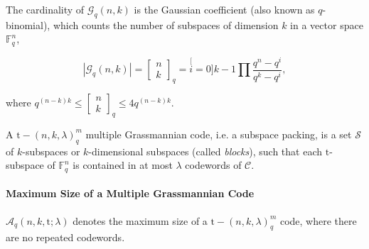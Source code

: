 The cardinality of $\mathcal{G}_{q}\left(n,k\right)$ is the Gaussian
coefficient (also known as $q$-binomial), which counts the number
of subspaces of dimension $k$ in a vector space $\ensuremath{\mathbb{F}}_{q}^{n}$,

\[
\left|\mathcal{G}_{q}\left(n,k\right)\right|=\left[\begin{array}{c}
n\\
k
\end{array}\right]_{q}=\stackrel[i=0]{k-1}{\prod}\frac{q^{n}-q^{i}}{q^{k}-q^{i}},
\]

where $q^{\left(n-k\right)k}\leq\left[\begin{array}{c}
n\\
k
\end{array}\right]_{q}\leq4q^{\left(n-k\right)k}$.

\begin{defn}
 A $\mathrm{t}-\left(n,k,\lambda\right)_{q}^{m}$ multiple Grassmannian
code, i.e. a subspace packing, is a set $\mathcal{S}$ of $k$-subspaces
or $k$-dimensional subspaces (called \textit{blocks}), such that
each $\mathrm{t}$-subspace of $\ensuremath{\mathbb{F}}_{q}^{n}$
is contained in at most $\lambda$ codewords of $\mathcal{C}$. 
\end{defn}

\paragraph*{Maximum Size of a Multiple Grassmannian Code \cite{Etzion:2018}}

$\mathcal{A}_{q}\left(n,k,\mathrm{t};\lambda\right)$ denotes the
maximum size of a $\mathrm{t}-\left(n,k,\lambda\right)_{q}^{m}$ code,
where there are no repeated codewords. 

\clearpage